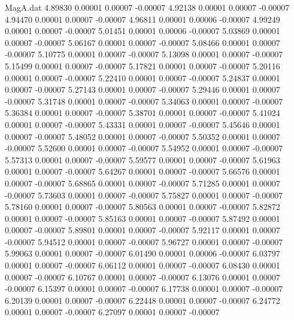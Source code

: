 \begin{filecontents}{MagA.dat}
   4.89830    0.00001    0.00007   -0.00007
   4.92138    0.00001    0.00007   -0.00007
   4.94470    0.00001    0.00007   -0.00007
   4.96811    0.00001    0.00006   -0.00007
   4.99249    0.00001    0.00007   -0.00007
   5.01451    0.00001    0.00006   -0.00007
   5.03869    0.00001    0.00007   -0.00007
   5.06167    0.00001    0.00007   -0.00007
   5.08466    0.00001    0.00007   -0.00007
   5.10775    0.00001    0.00007   -0.00007
   5.13098    0.00001    0.00007   -0.00007
   5.15499    0.00001    0.00007   -0.00007
   5.17821    0.00001    0.00007   -0.00007
   5.20116    0.00001    0.00007   -0.00007
   5.22410    0.00001    0.00007   -0.00007
   5.24837    0.00001    0.00007   -0.00007
   5.27143    0.00001    0.00007   -0.00007
   5.29446    0.00001    0.00007   -0.00007
   5.31748    0.00001    0.00007   -0.00007
   5.34063    0.00001    0.00007   -0.00007
   5.36384    0.00001    0.00007   -0.00007
   5.38701    0.00001    0.00007   -0.00007
   5.41024    0.00001    0.00007   -0.00007
   5.43331    0.00001    0.00007   -0.00007
   5.45646    0.00001    0.00007   -0.00007
   5.48052    0.00001    0.00007   -0.00007
   5.50352    0.00001    0.00007   -0.00007
   5.52600    0.00001    0.00007   -0.00007
   5.54952    0.00001    0.00007   -0.00007
   5.57313    0.00001    0.00007   -0.00007
   5.59577    0.00001    0.00007   -0.00007
   5.61963    0.00001    0.00007   -0.00007
   5.64267    0.00001    0.00007   -0.00007
   5.66576    0.00001    0.00007   -0.00007
   5.68865    0.00001    0.00007   -0.00007
   5.71285    0.00001    0.00007   -0.00007
   5.73603    0.00001    0.00007   -0.00007
   5.75827    0.00001    0.00007   -0.00007
   5.78160    0.00001    0.00007   -0.00007
   5.80563    0.00001    0.00007   -0.00007
   5.82872    0.00001    0.00007   -0.00007
   5.85163    0.00001    0.00007   -0.00007
   5.87492    0.00001    0.00007   -0.00007
   5.89801    0.00001    0.00007   -0.00007
   5.92117    0.00001    0.00007   -0.00007
   5.94512    0.00001    0.00007   -0.00007
   5.96727    0.00001    0.00007   -0.00007
   5.99063    0.00001    0.00007   -0.00007
   6.01490    0.00001    0.00006   -0.00007
   6.03797    0.00001    0.00007   -0.00007
   6.06112    0.00001    0.00007   -0.00007
   6.08430    0.00001    0.00007   -0.00007
   6.10767    0.00001    0.00007   -0.00007
   6.13076    0.00001    0.00007   -0.00007
   6.15397    0.00001    0.00007   -0.00007
   6.17738    0.00001    0.00007   -0.00007
   6.20139    0.00001    0.00007   -0.00007
   6.22448    0.00001    0.00007   -0.00007
   6.24772    0.00001    0.00007   -0.00007
   6.27097    0.00001    0.00007   -0.00007

\end{filecontents}
